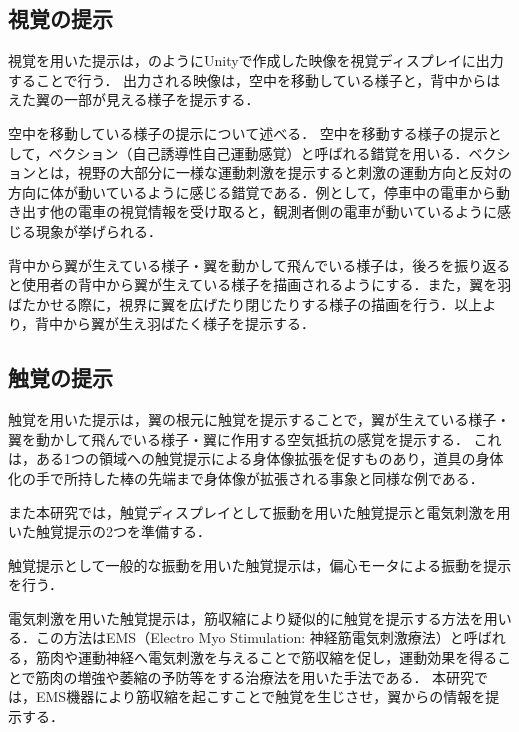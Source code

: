 \begin{small}
    \subsection{視覚の提示} %
      
      視覚を用いた提示は，のようにUnityで作成した映像を視覚ディスプレイに出力することで行う．
      出力される映像は，空中を移動している様子と，背中からはえた翼の一部が見える様子を提示する．

      空中を移動している様子の提示について述べる．
      空中を移動する様子の提示として，ベクション（自己誘導性自己運動感覚）と呼ばれる錯覚を用いる．ベクションとは，視野の大部分に一様な運動刺激を提示すると刺激の運動方向と反対の方向に体が動いているように感じる錯覚である\cite{妹尾武治2014ベクションとその周辺の近年の動向}．例として，停車中の電車から動き出す他の電車の視覚情報を受け取ると，観測者側の電車が動いているように感じる現象が挙げられる．

      背中から翼が生えている様子・翼を動かして飛んでいる様子は，後ろを振り返ると使用者の背中から翼が生えている様子を描画されるようにする．また，翼を羽ばたかせる際に，視界に翼を広げたり閉じたりする様子の描画を行う．以上より，背中から翼が生え羽ばたく様子を提示する．

    \subsection{触覚の提示} %
      触覚を用いた提示は，翼の根元に触覚を提示することで，翼が生えている様子・翼を動かして飛んでいる様子・翼に作用する空気抵抗の感覚を提示する．
      これは，ある1つの領域への触覚提示による身体像拡張を促すものあり，道具の身体化の手で所持した棒の先端まで身体像が拡張される事象と同様な例である．
      
      また本研究では，触覚ディスプレイとして振動を用いた触覚提示と電気刺激を用いた触覚提示の2つを準備する．
      
      触覚提示として一般的な振動を用いた触覚提示は，偏心モータによる振動を提示を行う．
  
      電気刺激を用いた触覚提示は，筋収縮により疑似的に触覚を提示する方法を用いる．この方法はEMS（Electro Myo Stimulation: 神経筋電気刺激療法）と呼ばれる，筋肉や運動神経へ電気刺激を与えることで筋収縮を促し，運動効果を得ることで筋肉の増強や萎縮の予防等をする治療法を用いた手法である．
      本研究では，EMS機器により筋収縮を起こすことで触覚を生じさせ，翼からの情報を提示する．



\end{small}
